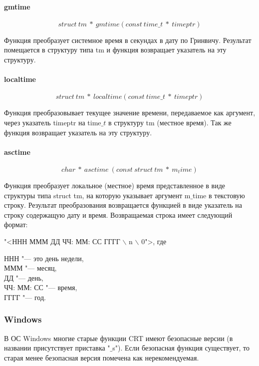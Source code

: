 \documentclass{article}
\begin{document}
			\paragraph*{gmtime}	
			$$struct~tm~*~gmtime(const~time\_t~*~timeptr)$$
			
				Функция преобразует системное время в секундах в дату по Гринвичу. Результат помещается в структуру типа tm и 					функция возвращает указатель на эту структуру.
				
			\paragraph*{localtime}
			$$struct~tm~*~localtime(const~time\_t~*~timeptr)$$
			
				Функция преобразовывает текущее значение времени, передаваемое как аргумент, через указатель timeptr на time$\_t$ 			в структуру tm (местное время). Так же функция возвращает указатель на эту структуру.
			
			\paragraph*{asctime}
			$$char~*~asctime~(const~struct~tm~*~m_time)$$			
			
				Функция преобразует локальное (местное) время представленное в виде структуры типа struct tm, на которую 						указывает аргумент m$\_$time в текстовую строку. Результат преобразования возвращается функцией в виде указатель на 				строку содержащую дату и время. 
			Возвращаемая строка имеет следующий формат:
			\begin{center}
				"<ННН МММ ДД ЧЧ: ММ: СС ГГГГ $\backslash$ n $\backslash$ 0">, где\\
			\end{center}
			ННН "--- это день недели,\\
			МММ "--- месяц,\\
			ДД "--- день,\\
			ЧЧ: ММ: СС "--- время,\\
			ГГГГ "--- год.	
			
			
		\subsubsection{Windows}	
			В ОС Windows многие старые функции CRT имеют безопасные версии (в названии присутствует приставка "$\_$s"). Если 				безопасная функция существует, то старая менее безопасная версия помечена как нерекомендуемая. 
			
\end{document}
